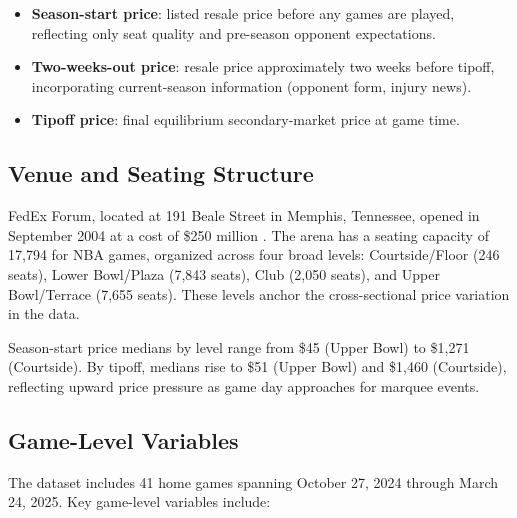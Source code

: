 \documentclass[12pt]{article}
\begin{document}
\begin{itemize}
    \item \textbf{Season-start price}: listed resale price before any games are played, reflecting only seat quality and pre-season opponent expectations.
    \item \textbf{Two-weeks-out price}: resale price approximately two weeks before tipoff, incorporating current-season information (opponent form, injury news).
    \item \textbf{Tipoff price}: final equilibrium secondary-market price at game time.
\end{itemize}
 
\subsection{Venue and Seating Structure}
 
FedEx Forum, located at 191 Beale Street in Memphis, Tennessee, opened in September 2004 at a cost of \$250 million \citep{fedexforum2024about}. The arena has a seating capacity of 17,794 for NBA games, organized across four broad levels: Courtside/Floor (246 seats), Lower Bowl/Plaza (7,843 seats), Club (2,050 seats), and Upper Bowl/Terrace (7,655 seats). These levels anchor the cross-sectional price variation in the data.
 
Season-start price medians by level range from \$45 (Upper Bowl) to \$1,271 (Courtside). By tipoff, medians rise to \$51 (Upper Bowl) and \$1,460 (Courtside), reflecting upward price pressure as game day approaches for marquee events.
 
\subsection{Game-Level Variables}
 
The dataset includes 41 home games spanning October 27, 2024 through March 24, 2025.
Key game-level variables include:
 
\end{document}
